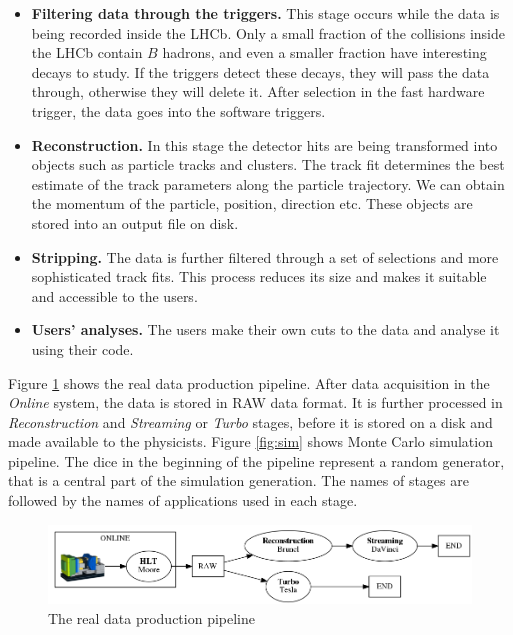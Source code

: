 \begin{itemize}
    \item \textbf{Filtering data through the triggers.} This stage occurs while the data is being recorded inside the LHCb. Only a small fraction of the collisions inside the LHCb contain $B$ hadrons, and even a smaller fraction have interesting decays to study. If the triggers detect these decays, they will pass the data through, otherwise they will delete it. After selection in the fast hardware trigger, the data goes into the software triggers.
    \item \textbf{Reconstruction.} In this stage the detector hits are being transformed into objects such as particle tracks and clusters. The track fit determines the best estimate of the track parameters along the particle trajectory. We can obtain the momentum of the particle, position, direction etc. These objects are stored into an output file on disk.
    \item \textbf{Stripping.} The data is further filtered through a set of selections and more sophisticated track fits. This process reduces its size and makes it suitable and accessible to the users.
    \item \textbf{Users' analyses.} The users make their own cuts to the data and analyse it using their code.
\end{itemize}

\fi 
Figure \ref{fig:real} shows the real data production pipeline. After data acquisition in the {\it Online} system, the data is stored in RAW data format. It is further processed in \emph{Reconstruction} and \emph{Streaming} or \emph{Turbo} stages, before it is stored on a disk and made available to the physicists. 
Figure \ref{fig:sim} shows Monte Carlo simulation pipeline. The dice in the beginning of the pipeline represent a random generator, that is a central part of the simulation generation. The names of stages are followed by the names of applications used in each stage. 

\begin{figure}[h]
    \centering
    \includegraphics[width=\textwidth]{img/real}
    \caption{The real data production pipeline}
    \label{fig:real}
\end{figure}

